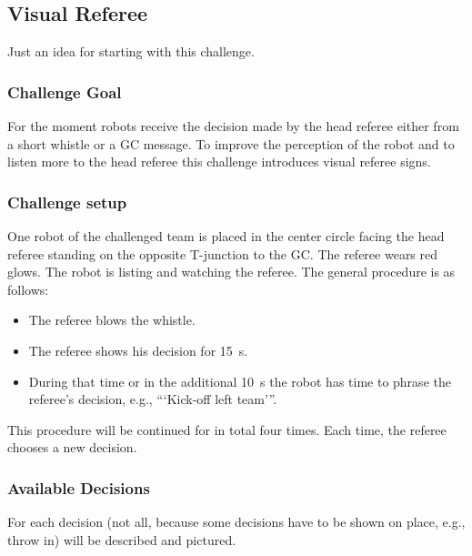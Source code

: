 \subsection{Visual Referee}

    Just an idea for starting with this challenge.
    
    \subsubsection{Challenge Goal}

        For the moment robots receive the decision made by the head referee either from a short whistle or a GC message. To improve the perception of the robot and to listen more to the head referee this challenge introduces visual referee signs.

    \subsubsection{Challenge setup}

        One robot of the challenged team is placed in the center circle facing the head referee standing on the opposite T-junction to the GC. The referee wears red glows. The robot is listing and watching the referee. The general procedure is as follows:

        \begin{itemize}
            \item The referee blows the whistle.
            \item The referee shows his decision for \qty{15}{\second}.
            \item During that time or in the additional \qty{10}{\second} the robot has time to phrase the referee's decision, e.g., ```Kick-off left team'''. 
        \end{itemize}

        This procedure will be continued for in total four times. Each time, the referee chooses a new decision.

    \subsubsection{Available Decisions}
        
        For each decision (not all, because some decisions have to be shown on place, e.g., throw in) will be described and pictured.

